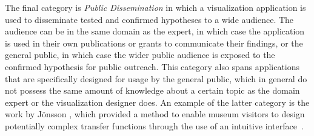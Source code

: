 The final category is \emph{Public Dissemination} in which a visualization application is used to disseminate tested and confirmed hypotheses to a wide audience.  The audience can be in the same domain as the expert, in which case the application is used in their own publications or grants to communicate their findings, or the general public, in which case the wider public audience is exposed to the confirmed hypothesis for public outreach.  This category also spans applications that are specifically designed for usage by the general public, which in general do not possess the same amount of knowledge about a certain topic as the domain expert or the visualization designer does.  An example of the latter category is the work by J\"onsson \etal , which provided a method to enable museum visitors to design potentially complex transfer functions through the use of an intuitive interface~\cite{jonsson2016intuitive}.
